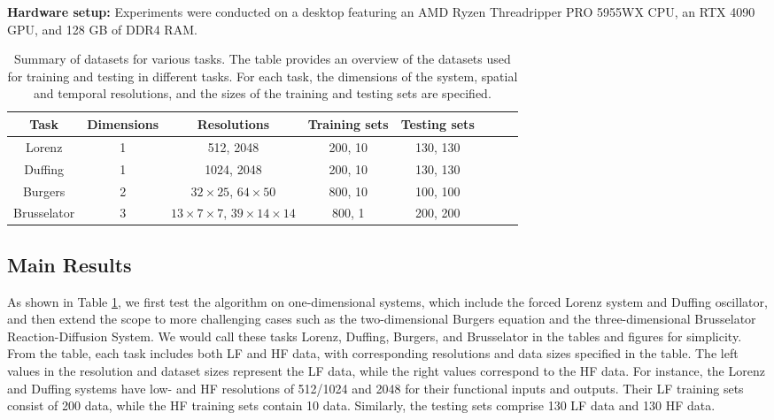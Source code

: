 \textbf{Hardware setup:} Experiments were conducted on a desktop featuring an AMD Ryzen Threadripper PRO 5955WX CPU, an RTX 4090 GPU, and 128 GB of DDR4 RAM.

\begin{table}[!htbp]\centering
\caption{Summary of datasets for various tasks. The table provides an overview of the datasets used for training and testing in different tasks. For each task, the dimensions of the system, spatial and temporal resolutions, and the sizes of the training and testing sets are specified.}\label{tab:data_summary}
\begin{tabular}{cccccccc}
\toprule
{Task} & {Dimensions} & {Resolutions}       & {Training sets} & {Testing sets} \\ \midrule
Lorenz       & 1  & 512, 2048   & 200, 10     & 130, 130   \\
Duffing      & 1  & 1024, 2048   & 200, 10     & 130, 130   \\
Burgers      & 2  & $32\times 25$, $64\times 50$      & 800, 10     & 100, 100   \\
Brusselator    & 3  & $13\times 7\times 7$, $39\times 14\times 14$ & 800, 1      & 200, 200  \\ \bottomrule
\end{tabular}
\end{table}

\subsection{Main Results}\label{subsec:exp_results}
As shown in Table \ref{tab:data_summary}, we first test the algorithm on one-dimensional systems, which include the forced Lorenz system and Duffing oscillator, and then extend the scope to more challenging cases such as the two-dimensional Burgers equation and the three-dimensional Brusselator Reaction-Diffusion System. We would call these tasks Lorenz, Duffing, Burgers, and Brusselator in the tables and figures for simplicity. From the table, each task includes both LF and HF data, with corresponding resolutions and data sizes specified in the table. The left values in the resolution and dataset sizes represent the LF data, while the right values correspond to the HF data. For instance, the Lorenz and Duffing systems have low- and HF resolutions of 512/1024 and 2048 for their functional inputs and outputs. Their LF training sets consist of 200 data, while the HF training sets contain 10 data. Similarly, the testing sets comprise 130 LF data and 130 HF data.


